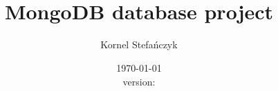 


\title{\\ \large{MongoDB database project}}
\author{Kornel Stefańczyk}
\date{\today\\version: }



\maketitle

\tableofcontents









